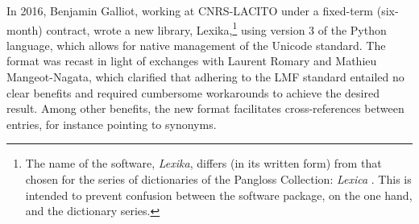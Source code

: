 In 2016, Benjamin Galliot, working at CNRS-LACITO under a fixed-term (six-month) contract, wrote a new library, Lexika,\footnote{The name of the software, \emph{Lexika}, differs (in its written form) from that chosen for the series of dictionaries of the Pangloss Collection: \emph{Lexica} \parencite{lexica2017}. This is intended to prevent confusion between the software package, on the one hand, and the dictionary series.} using version 3 of the Python language, which allows for native management of the Unicode standard. The format was recast in light of exchanges with Laurent Romary and Mathieu Mangeot-Nagata, which clarified that adhering to the LMF standard entailed no clear benefits and required cumbersome workarounds to achieve the desired result. Among other benefits, the new format facilitates cross-references between entries, for instance pointing to synonyms.




